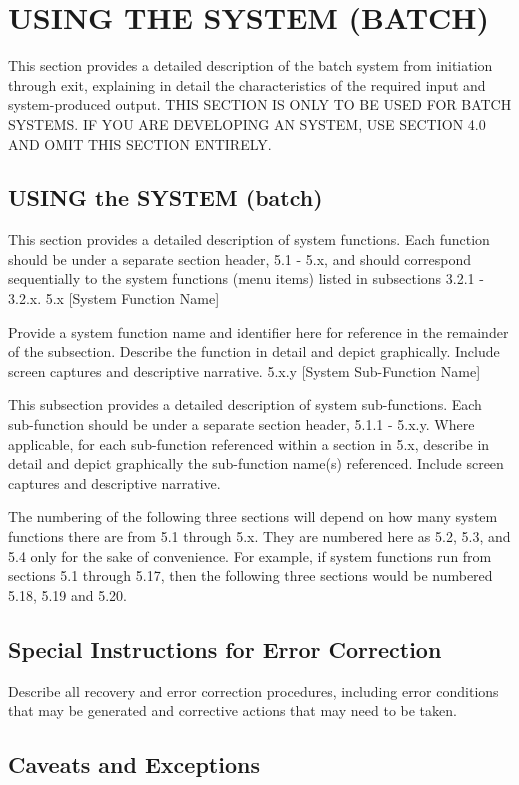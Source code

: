 \documentclass[10pt,letterpaper,extrafontsizes]{memoir}
\begin{document}
\chapter{USING THE SYSTEM (BATCH)}

This section provides a detailed description of the batch system from initiation through exit, explaining in detail the characteristics of the required input and system-produced output.  THIS SECTION IS ONLY TO BE USED FOR BATCH SYSTEMS.  IF YOU ARE DEVELOPING AN  SYSTEM, USE SECTION 4.0 AND OMIT THIS SECTION ENTIRELY.

\section{USING the SYSTEM (batch)}

This section provides a detailed description of system functions.  Each function should be under a separate section header, 5.1 - 5.x, and should correspond sequentially to the system functions (menu items) listed in subsections 3.2.1 - 3.2.x.
5.x	[System Function Name]

Provide a system function name and identifier here for reference in the remainder of the subsection.  Describe the function in detail and depict graphically.  Include screen captures and descriptive narrative.
5.x.y	[System Sub-Function Name]

This subsection provides a detailed description of system sub-functions.  Each sub-function should be under a separate section header, 5.1.1 - 5.x.y.  Where applicable, for each sub-function referenced within a section in 5.x, describe in detail and depict graphically the sub-function name(s) referenced.  Include screen captures and descriptive narrative.

The numbering of the following three sections will depend on how many system functions there are from 5.1 through 5.x.  They are numbered here as 5.2, 5.3, and 5.4 only for the sake of convenience.  For example, if system functions run from sections 5.1 through 5.17, then the following three sections would be numbered 5.18, 5.19 and 5.20.
\section{Special Instructions for Error Correction}

Describe all recovery and error correction procedures, including error conditions that may be generated and corrective actions that may need to be taken.
\section{Caveats and Exceptions}
\end{document}
